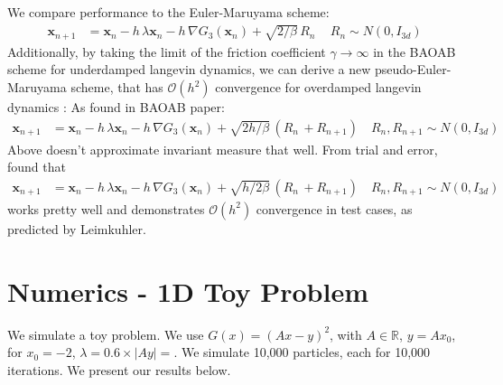 \documentclass{article}
\renewcommand{\vec}[1]{{\mathbf{#1}}}
\begin{document}
We compare performance to the Euler-Maruyama scheme:
\begin{equation} 
\begin{split} 
\vec x_{n+1}&=\vec x_{n} - h \,\lambda \vec x_{n} - h\,\nabla G_{3}(\vec x_n) +\sqrt{2/\beta} \, R_n\, \quad R_n \sim N(0,I_{3d})
\label{euler}
\end{split}
\end{equation}
Additionally, by taking the limit of the friction coefficient $\gamma \to \infty$ in the BAOAB scheme for underdamped langevin dynamics, we can derive a new pseudo-Euler-Maruyama scheme, that has $\mathcal{O}(h^2)$ convergence for overdamped langevin dynamics \cite{leimkuhler_baoab}:
As found in BAOAB paper:
\begin{equation} 
\begin{split} 
\vec x_{n+1}&=\vec x_{n} - h \,\lambda \vec x_{n} - h\,\nabla G_{3}(\vec x_n) +\sqrt{2h/\beta} \, (R_n\, + R_{n+1}) \quad R_n, R_{n+1} \sim N(0,I_{3d})
\label{pseudo-euler}
\end{split}
\end{equation}
Above doesn't approximate invariant measure that well. From trial and error, found that
\begin{equation}
\begin{aligned}
\vec x_{n+1}&=\vec x_{n} - h \,\lambda \vec x_{n} - h\,\nabla G_{3}(\vec x_n) +\sqrt{h/2\beta} \, (R_n\, + R_{n+1}) \quad R_n, R_{n+1} \sim N(0,I_{3d})
\end{aligned}
\end{equation}
works pretty well and demonstrates $\mathcal{O}(h^2)$ convergence in test cases, as predicted by Leimkuhler.


\section{Numerics - 1D Toy Problem}
We simulate a toy problem. We use $G(x) = (Ax-y)^2$, with $A \in \mathbb{R}$, $y = Ax_0$, for $x_0 = -2$, $\lambda = 0.6 \times |Ay| = $. We simulate 10,000 particles, each for 10,000 iterations. We present our results below.






\appendix 
\end{document}
